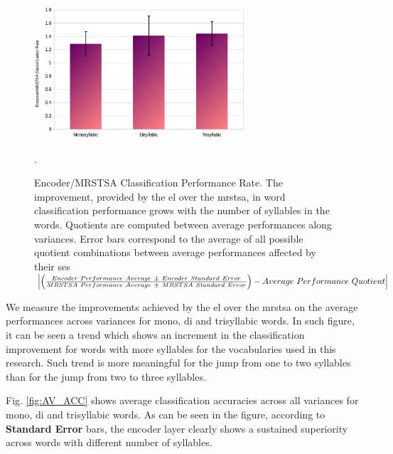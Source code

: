 \documentclass[10pt,letterpaper]{article}
\DeclarePairedDelimiter\abs{\lvert}{\rvert}%
\begin{document}
\begin{figure}[h!]
    \centering
    \includegraphics[width=0.7\textwidth]{Improvement.png}
    \caption{Encoder/MRSTSA Classification Performance Rate.
    The improvement, provided by the \gls{el} over the \gls{mrstsa}, in word classification performance grows with the number of syllables in the words.
    Quotients are computed between average performances along variances.
    Error bars correspond to the average of all possible quotient combinations between average performances affected by their \glspl{se}
    {\tiny $\abs*{\left (\frac{Encoder~Performance~Average ~\pm~ Encoder~Standard~Error}{MRSTSA~Performance~Average ~\pm~ MRSTSA~Standard~Error}\right )-Average~Performance~Quotient}$}}.
    \label{fig:Improvement}
\end{figure}

We measure the improvements achieved by the \gls{el} over the \gls{mrstsa} on the average performances across variances
for mono, di and trisyllabic words.
In such figure, it can be seen a trend which shows an increment in the classification improvement for words
with more syllables for the vocabularies used in this research.
Such trend is more meaningful for the jump from one to two syllables than for the jump from two to three syllables.
\fi


Fig. \ref{fig:AV_ACC} shows average classification accuracies across all variances for mono, di and trisyllabic words.
As can be seen in the figure, according to \textbf{Standard Error} bars, the encoder layer clearly shows
a sustained superiority across words with different number of syllables.
 
\end{document}
